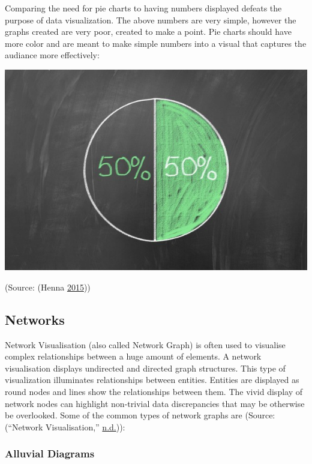 \documentclass[]{book}
\begin{document}
Comparing the need for pie charts to having numbers displayed defeats the purpose of data visualization. The above numbers are very simple, however the graphs created are very poor, created to make a point. Pie charts should have more color and are meant to make simple numbers into a visual that captures the audiance more effectively:

\includegraphics{images/50-50-pretty.jpg}

(Source: (Henna \protect\hyperlink{ref-50-percent-Henna-Chai}{2015}))

\hypertarget{networks}{%
\subsection{Networks}\label{networks}}

Network Visualisation (also called Network Graph) is often used to visualise complex relationships between a huge amount of elements. A network visualisation displays undirected and directed graph structures. This type of visualization illuminates relationships between entities. Entities are displayed as round nodes and lines show the relationships between them. The vivid display of network nodes can highlight non-trivial data discrepancies that may be otherwise be overlooked. Some of the common types of network graphs are (Source: (``Network Visualisation,'' \protect\hyperlink{ref-networks}{n.d.})):

\hypertarget{alluvial-diagrams}{%
\subsubsection{Alluvial Diagrams}\label{alluvial-diagrams}}
\end{document}
